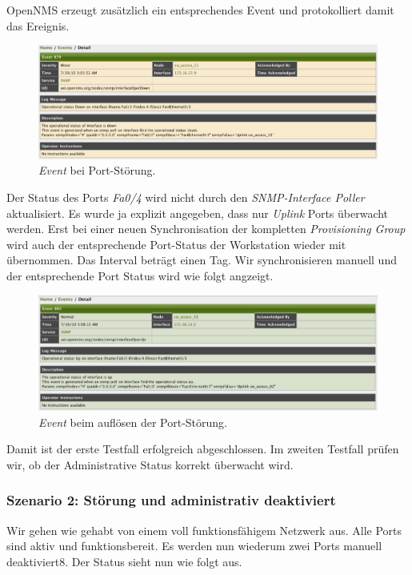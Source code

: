 OpenNMS erzeugt zusätzlich ein entsprechendes Event und protokolliert damit das Ereignis.

\begin{figure}[H]
	\centering
	\includegraphics[width=1.0\textwidth]{images/use-cases/monitoring-layer-2/port-down-event}
	\caption{\emph{Event} bei Port-Störung.}
	\label{pic:port-down-event}
\end{figure}

Der Status des Ports \emph{Fa0/4} wird nicht durch den \emph{SNMP-Interface Poller} aktualisiert. Es wurde ja explizit angegeben, dass nur \emph{Uplink} Ports überwacht werden. Erst bei einer neuen Synchronisation der kompletten \emph{Provisioning Group} wird auch der entsprechende Port-Status der Workstation wieder mit übernommen. Das Interval beträgt einen Tag. Wir synchronisieren manuell und der entsprechende Port Status wird wie folgt angzeigt.

\begin{figure}[H]
	\centering
	\includegraphics[width=1.0\textwidth]{images/use-cases/monitoring-layer-2/port-up-event}
	\caption{\emph{Event} beim auflösen der Port-Störung.}
	\label{pic:port-up-event}
\end{figure}

Damit ist der erste Testfall erfolgreich abgeschlossen. Im zweiten Testfall prüfen wir, ob der Administrative Status korrekt überwacht wird.

\subsubsection{Szenario 2: Störung und administrativ deaktiviert}
Wir gehen wie gehabt von einem voll funktionsfähigem Netzwerk aus. Alle Ports sind aktiv und funktionsbereit. Es werden nun wiederum zwei Ports manuell deaktiviert8. Der Status sieht nun wie folgt aus.


